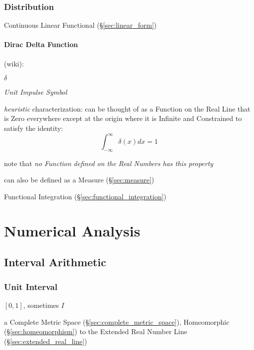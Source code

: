 \subsubsection{Distribution}\label{sec:distribution}

Continuous Linear Functional (\S\ref{sec:linear_form})



\paragraph{Dirac Delta Function}\label{sec:dirac_delta}\hfill

(wiki):

$\delta$

\emph{Unit Impulse Symbol}

\emph{heuristic} characterization: can be thought of as a Function on the Real
Line that is Zero everywhere except at the origin where it is Infinite and
Constrained to satisfy the identity:
\[
  \int_{-\infty}^\infty \delta(x) dx = 1
\]

note that \emph{no Function defined on the Real Numbers has this property}

can also be defined as a Measure (\S\ref{sec:measure})

\fist Functional Integration (\S\ref{sec:functional_integration})



\section{Numerical Analysis}\label{sec:numerical_analysis}

\subsection{Interval Arithmetic}\label{sec:interval_arithmetic}

\subsubsection{Unit Interval}\label{sec:unit_interval}

$[0,1]$, sometimes $I$

a Complete Metric Space (\S\ref{sec:complete_metric_space}),
Homeomorphic (\S\ref{sec:homeomorphism}) to the Extended Real Number
Line (\S\ref{sec:extended_real_line})



